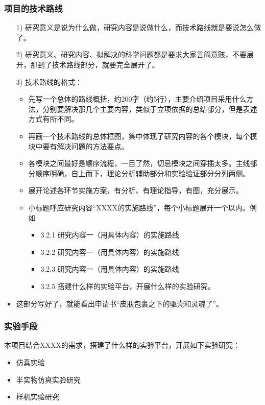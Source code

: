 \subsubsection{项目的技术路线}
\begin{itemize}
\item[1)] 研究意义是说为什么做，研究内容是说做什么，而技术路线就是要说怎么做了。

\item[2)] 研究意义、研究内容、拟解决的科学问题都是要求大家言简意赅，不要展开，那到了技术路线部分，就要完全展开了。

\item[3)] 技术路线的格式：
\begin{itemize}
\item 先写一个总体的路线概括，约200字（约5行），主要介绍项目采用什么方法，分别要解决那几个主要内容，类似于立项依据的总结部分，但是表述方式有所不同。

\item 再画一个技术路线的总体框图，集中体现了研究内容的各个模块，每个模块中要有解决问题的方法要点。

\item 各模块之间最好是顺序流程，一目了然，切忌模块之间穿插太多。主线部分顺序明确，自上而下，理论分析辅助部分和实验验证部分分列两侧。

\item 展开论述各环节实施方案，有分析、有理论指导，有图，充分展示。

\item 小标题呼应研究内容“XXXX的实施路线”，每个小标题展开一个以内。例如
	\begin{itemize}
	\item 3.2.1 研究内容一（用具体内容）的实施路线
	\item 3.2.2 研究内容一（用具体内容）的实施路线
	\item 3.2.3 研究内容一（用具体内容）的实施路线
	\item 3.2.5 搭建什么样的实验平台，开展什么样的实验研究。
\end{itemize}
\end{itemize}
\item 这部分写好了，就能看出申请书“皮肤包裹之下的驱壳和灵魂了”。
\end{itemize}


\subsubsection{实验手段}
本项目结合XXXX的需求，搭建了什么样的实验平台，开展如下实验研究：
\begin{itemize}
\item 仿真实验
\item 半实物仿真实验研究
\item 样机实验研究
\end{itemize}


